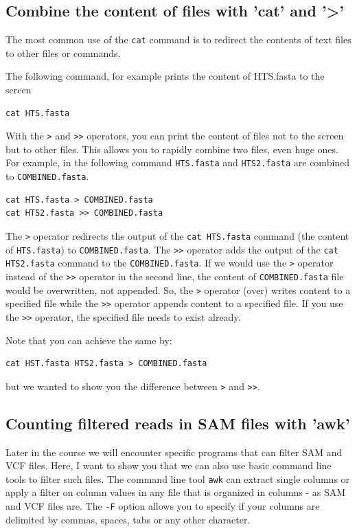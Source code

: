 \documentclass[11pt]{article}
\begin{document}
\subsection{Combine the content of files with 'cat' and '>'}
\label{sec-4-4}
The most common use of the \texttt{cat} command is to redirect the contents of
text files to other files or commands.

The following command, for example prints the content of HTS.fasta to the screen

\begin{verbatim}
cat HTS.fasta
\end{verbatim}

With the \texttt{>} and \texttt{>>} operators, you can print the content of files
not to the screen but to other files. This allows you to rapidly combine
two files, even huge ones. For example, in the following command
\texttt{HTS.fasta} and \texttt{HTS2.fasta} are combined to
\texttt{COMBINED.fasta}.

\begin{verbatim}
cat HTS.fasta > COMBINED.fasta
cat HTS2.fasta >> COMBINED.fasta
\end{verbatim}

The \texttt{>} operator redirects the output of the \texttt{cat HTS.fasta}
command (the content of \texttt{HTS.fasta}) to \texttt{COMBINED.fasta}. The
\texttt{>>} operator adds the output of the \texttt{cat HTS2.fasta} command to
the \texttt{COMBINED.fasta}. If we would use the \texttt{>} operator instead of
the \texttt{>>} operator in the second line, the content of
\texttt{COMBINED.fasta} file would be overwritten, not appended. So, the \texttt{>}
operator (over) writes content to a specified file while the \texttt{>>}
operator appends content to a specified file. If you use the \texttt{>>}
operator, the specified file needs to exist already.

Note that you can achieve the same by:

\begin{verbatim}
cat HST.fasta HTS2.fasta > COMBINED.fasta
\end{verbatim}

but we wanted to show you the difference between \texttt{>} and \texttt{>>}.

\subsection{Counting filtered reads in SAM files with 'awk'}
\label{sec-4-5}
Later in the course we will encounter specific programs that can filter
SAM and VCF files. Here, I want to show you that we can also use basic
command line tools to filter such files.  The command line tool \texttt{awk}
can extract single columns or apply a filter on column values in
any file that is organized in columns - as SAM and VCF files
are. The \texttt{-F} option allows you to specify if your columns are
delimited by commas, spaces, tabs or any other character.
\end{document}
